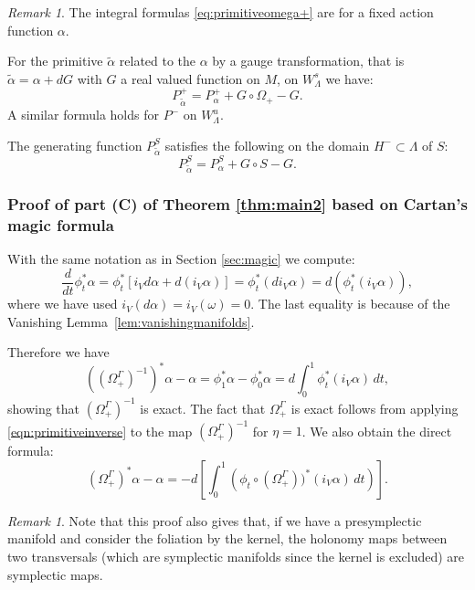 \documentclass[11pt]{amsart}
\theoremstyle{definition}
\theoremstyle{remark}
\newtheorem{rem}[thm]{Remark}
\numberwithin{equation}{section}
\begin{document}
\begin{rem}\label{rem:primitiveomega+}
The integral formulas \eqref{eq:primitiveomega+} are for a fixed  action function $\alpha$.

  For the primitive $\tilde \alpha$
  related to the $\alpha$ by a gauge transformation, that is
  $\tilde \alpha = \alpha + dG$ with $G$ a real valued function on $M$,
   on $W^{s}_\Lambda$  we have:
  \begin{equation}\label{eqn:gauge_Omega}
  P^+_{\tilde \alpha} = P^+_\alpha + G \circ \Omega_+ - G.
  \end{equation}
  A similar formula holds for $P^-$ on $W^u_\Lambda$.



  The generating function $P^S_{\tilde \alpha}$ satisfies the following on the domain  $H^- \subset \Lambda$ of $S$:
  \[
  P^S_{\tilde \alpha} = P^S_\alpha + G \circ S   - G.
  \]
\end{rem}





\subsubsection{Proof of part (C) of Theorem \ref{thm:main2} based on Cartan's magic formula}\label{sec:Cartanexact}


With the same notation as in Section \ref{sec:magic}  we compute:
\[
\frac{d}{dt} \phi_t^* \alpha = \phi^*_t\left[   i_V d\alpha +   d (i_V\alpha)  \right]
 =  \phi_t ^* (d i_V \alpha)  =  d ( \phi^*_t ( i_V\alpha)),
\]
where we have  used $i_V (d\alpha)   = i_V (\omega) = 0$.
The last equality is because of the Vanishing Lemma~\ref{lem:vanishingmanifolds}.

Therefore we have
\[
((\Omega_+^\Gamma)^{-1})^*\alpha - \alpha  = \phi_1^* \alpha -  \phi^*_0 \alpha
= d   \int_0^1   \phi^*_t ( i_V\alpha)\, dt,
\]
showing that $(\Omega_+^\Gamma)^{-1}$  is exact. The fact that $\Omega_+^\Gamma $ is exact follows from applying \eqref{eqn:primitiveinverse} to the map $(\Omega_+^\Gamma)^{-1}$   for $\eta=1$. We also obtain the direct formula:
\[(\Omega_+^\Gamma)^*\alpha - \alpha=-d\left[   \int_0^1  \left (\phi_t\circ (\Omega_+^\Gamma))^* ( i_V\alpha)\, dt\right)\right].\]


\begin{rem} Note that this proof also gives that, if we have
a presymplectic manifold and consider the
foliation by the kernel, the holonomy maps between
two transversals (which are symplectic manifolds since the kernel
is excluded) are symplectic maps.\end{rem}
\end{document}
